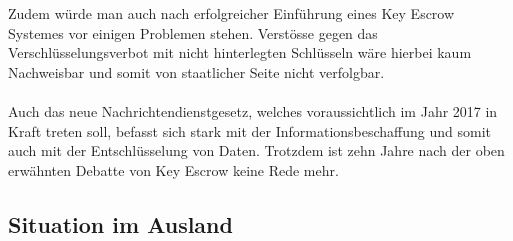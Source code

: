Zudem würde man auch nach erfolgreicher Einführung eines Key Escrow Systemes vor einigen Problemen stehen. Verstösse gegen das Verschlüsselungsverbot mit nicht hinterlegten Schlüsseln wäre hierbei kaum Nachweisbar und somit von staatlicher Seite nicht verfolgbar. \cite[S. 5735]{adminch} \\
\\
Auch das neue Nachrichtendienstgesetz, welches voraussichtlich im Jahr 2017 in Kraft treten soll, befasst sich stark mit der Informationsbeschaffung und somit auch mit der Entschlüsselung von Daten. Trotzdem ist  zehn Jahre nach der oben erwähnten Debatte von Key Escrow keine Rede mehr. \cite{botschaftndg} \cite{ndgesetz}  \\
		
	\subsection{Situation im Ausland}
		

